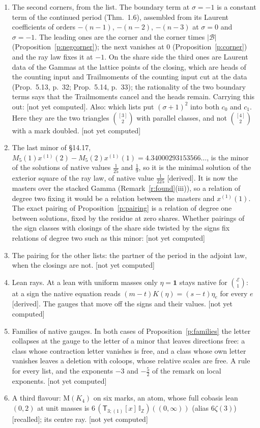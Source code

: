 \documentclass[11pt]{article}
\newcommand{\cE}{\mathcal E}
\newcommand{\cB}{\mathcal B}
\newcommand{\one}{\mathbf 1}
\newcommand{\sT}{\mathsf T}
\newcommand{\IZ}{\mathbb I_{\mathbb Z}}
\newcommand{\Tx}[3]{(\sT_{#1;(1)}[x]\,#2)((#3,\infty))}
\theoremstyle{plain}
\theoremstyle{definition}
\theoremstyle{remark}
\newcommand{\derived}{\textup{[derived]}}
\newcommand{\recalled}{\textup{[recalled]}}
\newcommand{\notyet}{\textup{[not yet computed]}}
\begin{document}
\begin{enumerate}[label=(\roman*)]
\item The second corners, from the list. The boundary term at $\sigma=-1$ is a constant term of the continued period (Thm.~1.6), assembled from its Laurent coefficients of orders $-(n-1)$, $-(n-2)$, $-(n-3)$ at $\sigma=0$ and $\sigma=-1$. The leading ones are the corner and the corner times $|\cB|$ (Proposition~\ref{p:negcorner}); the next vanishes at $0$ (Proposition~\ref{p:corner}) and the ray law fixes it at $-1$. On the share side the third ones are Laurent data of the Gammas at the lattice points of the closing, which are heads of the counting input and Trailmoments of the counting input cut at the data (Prop.~5.13, p.~32; Prop.~5.14, p.~33); the rationality of the two boundary terms says that the Trailmoments cancel and the heads remain. Carrying this out: \notyet. Also: which lists put $(\sigma+1)^2$ into both $c_0$ and $c_1$. Here they are the two triangles $\binom{[3]}2$ with parallel classes, and not $\binom{[4]}2$ with a mark doubled. \notyet
\item The last minor of \S14.17, $M_5(1)x^{(1)}(2)-M_5(2)x^{(1)}(1)=4.34000293153566\ldots$, is the minor of the solutions of native values $\frac1{25}$ and $\frac19$, so it is the minimal solution of the exterior square of the ray law, of native value $\frac1{225}$ \derived. It is now the masters over the stacked Gamma (Remark~\ref{r:found}(iii)), so a relation of degree two fixing it would be a relation between the masters and $x^{(1)}(1)$. The exact pairing of Proposition~\ref{p:pairing} is a relation of degree one between solutions, fixed by the residue at zero shares. Whether pairings of the sign classes with closings of the share side twisted by the signs fix relations of degree two such as this minor: \notyet
\item The pairing for the other lists: the partner of the period in the adjoint law, when the closings are not. \notyet
\item Lean rays. At a lean with uniform masses only $\eta=\one$ stays native for $\binom{\cE}1$: at a sign the native equation reads $(m-t)K(\eta)=(s-t)\eta_e$ for every $e$ \derived. The gauges that move off the signs and their values. \notyet
\item Families of native gauges. In both cases of Proposition~\ref{p:families} the letter collapses at the gauge to the letter of a minor that leaves directions free: a class whose contraction letter vanishes is free, and a class whose own letter vanishes leaves a deletion with coloops, whose relative scales are free. A rule for every list, and the exponents $-3$ and $-\frac52$ of the remark on local exponents. \notyet
\item A third flavour: $\mathrm M(K_4)$ on six marks, an atom, whose full cobasis lean $(0,2)$ at unit masses is $6\,\Tx{3}{\IZ}{0}$ (alias $6\zeta(3)$) \recalled; its centre ray. \notyet
\end{enumerate}
\end{document}
